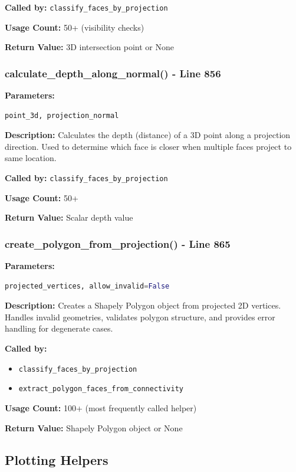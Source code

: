 \documentclass[11pt,a4paper]{article}
\begin{document}
\textbf{Called by:} \texttt{classify\_faces\_by\_projection}

\textbf{Usage Count:} 50+ (visibility checks)

\textbf{Return Value:} 3D intersection point or None

\subsubsection{calculate\_depth\_along\_normal() - Line 856}
\textbf{Parameters:}
\begin{lstlisting}[language=Python]
point_3d, projection_normal
\end{lstlisting}

\textbf{Description:}
Calculates the depth (distance) of a 3D point along a projection direction. Used to determine which face is closer when multiple faces project to same location.

\textbf{Called by:} \texttt{classify\_faces\_by\_projection}

\textbf{Usage Count:} 50+

\textbf{Return Value:} Scalar depth value

\subsubsection{create\_polygon\_from\_projection() - Line 865}
\textbf{Parameters:}
\begin{lstlisting}[language=Python]
projected_vertices, allow_invalid=False
\end{lstlisting}

\textbf{Description:}
Creates a Shapely Polygon object from projected 2D vertices. Handles invalid geometries, validates polygon structure, and provides error handling for degenerate cases.

\textbf{Called by:}
\begin{itemize}
    \item \texttt{classify\_faces\_by\_projection}
    \item \texttt{extract\_polygon\_faces\_from\_connectivity}
\end{itemize}

\textbf{Usage Count:} 100+ (most frequently called helper)

\textbf{Return Value:} Shapely Polygon object or None

\subsection{Plotting Helpers}
\end{document}
